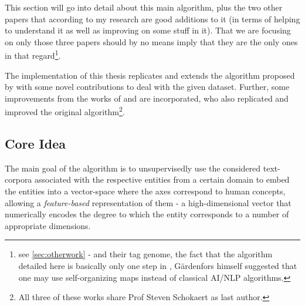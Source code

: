 

This section will go into detail about this main algorithm, plus the two other papers that according to my research are good additions to it (in terms of helping to understand it as well as improving on some stuff in it). That we are focusing on only those three papers should by no means imply that they are the only ones in that regard\footnote{see \autoref{sec:otherwork} - \cite{VISR12} and their tag genome, the fact that the algorithm detailed here is basically only one step in \cite{Alshaikh2019}, Gärdenfors himself suggested that one may use self-organizing maps instead of classical AI/NLP algorithms.}.


The implementation of this thesis replicates and extends the algorithm proposed by \textcite{Derrac2015} with some novel contributions to deal with the given dataset. Further, some improvements from the works of \textcite{Ager2018} and \textcite{Alshaikh2020} are incorporated, who also replicated and improved the original algorithm\footnote{All three of these works share Prof Steven Schokaert as last author.}.

\subsection{Core Idea}

The main goal of the algorithm is to unsupervisedly use the considered text-corpora associated with the respective entities from a certain domain %
to embed the entities into a vector-space where the axes correspond to human concepts, %
allowing a \textit{feature-based} representation of them - a high-dimensional vector that numerically encodes the degree %
to which the entity corresponds to a number of appropriate dimensions. %
\newline

